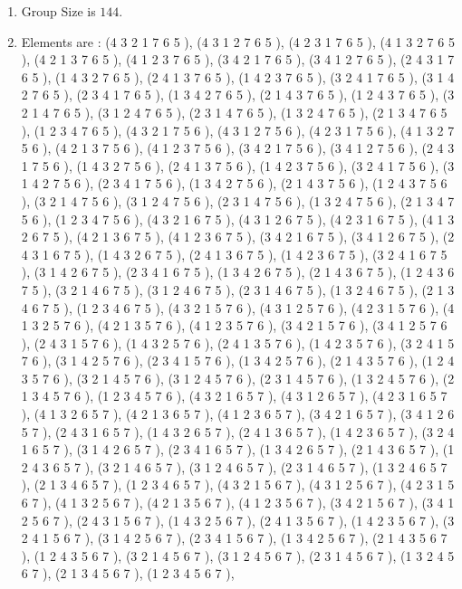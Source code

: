 \documentclass[12pt]{article}
\begin{document}
\begin{enumerate}
\item Group Size is $144$.
\item Elements are : (4 3 2 1 7 6 5  ), (4 3 1 2 7 6 5  ), (4 2 3 1 7 6 5  ), (4 1 3 2 7 6 5  ), (4 2 1 3 7 6 5  ), (4 1 2 3 7 6 5  ), (3 4 2 1 7 6 5  ), (3 4 1 2 7 6 5  ), (2 4 3 1 7 6 5  ), (1 4 3 2 7 6 5  ), (2 4 1 3 7 6 5  ), (1 4 2 3 7 6 5  ), (3 2 4 1 7 6 5  ), (3 1 4 2 7 6 5  ), (2 3 4 1 7 6 5  ), (1 3 4 2 7 6 5  ), (2 1 4 3 7 6 5  ), (1 2 4 3 7 6 5  ), (3 2 1 4 7 6 5  ), (3 1 2 4 7 6 5  ), (2 3 1 4 7 6 5  ), (1 3 2 4 7 6 5  ), (2 1 3 4 7 6 5  ), (1 2 3 4 7 6 5  ), (4 3 2 1 7 5 6  ), (4 3 1 2 7 5 6  ), (4 2 3 1 7 5 6  ), (4 1 3 2 7 5 6  ), (4 2 1 3 7 5 6  ), (4 1 2 3 7 5 6  ), (3 4 2 1 7 5 6  ), (3 4 1 2 7 5 6  ), (2 4 3 1 7 5 6  ), (1 4 3 2 7 5 6  ), (2 4 1 3 7 5 6  ), (1 4 2 3 7 5 6  ), (3 2 4 1 7 5 6  ), (3 1 4 2 7 5 6  ), (2 3 4 1 7 5 6  ), (1 3 4 2 7 5 6  ), (2 1 4 3 7 5 6  ), (1 2 4 3 7 5 6  ), (3 2 1 4 7 5 6  ), (3 1 2 4 7 5 6  ), (2 3 1 4 7 5 6  ), (1 3 2 4 7 5 6  ), (2 1 3 4 7 5 6  ), (1 2 3 4 7 5 6  ), (4 3 2 1 6 7 5  ), (4 3 1 2 6 7 5  ), (4 2 3 1 6 7 5  ), (4 1 3 2 6 7 5  ), (4 2 1 3 6 7 5  ), (4 1 2 3 6 7 5  ), (3 4 2 1 6 7 5  ), (3 4 1 2 6 7 5  ), (2 4 3 1 6 7 5  ), (1 4 3 2 6 7 5  ), (2 4 1 3 6 7 5  ), (1 4 2 3 6 7 5  ), (3 2 4 1 6 7 5  ), (3 1 4 2 6 7 5  ), (2 3 4 1 6 7 5  ), (1 3 4 2 6 7 5  ), (2 1 4 3 6 7 5  ), (1 2 4 3 6 7 5  ), (3 2 1 4 6 7 5  ), (3 1 2 4 6 7 5  ), (2 3 1 4 6 7 5  ), (1 3 2 4 6 7 5  ), (2 1 3 4 6 7 5  ), (1 2 3 4 6 7 5  ), (4 3 2 1 5 7 6  ), (4 3 1 2 5 7 6  ), (4 2 3 1 5 7 6  ), (4 1 3 2 5 7 6  ), (4 2 1 3 5 7 6  ), (4 1 2 3 5 7 6  ), (3 4 2 1 5 7 6  ), (3 4 1 2 5 7 6  ), (2 4 3 1 5 7 6  ), (1 4 3 2 5 7 6  ), (2 4 1 3 5 7 6  ), (1 4 2 3 5 7 6  ), (3 2 4 1 5 7 6  ), (3 1 4 2 5 7 6  ), (2 3 4 1 5 7 6  ), (1 3 4 2 5 7 6  ), (2 1 4 3 5 7 6  ), (1 2 4 3 5 7 6  ), (3 2 1 4 5 7 6  ), (3 1 2 4 5 7 6  ), (2 3 1 4 5 7 6  ), (1 3 2 4 5 7 6  ), (2 1 3 4 5 7 6  ), (1 2 3 4 5 7 6  ), (4 3 2 1 6 5 7  ), (4 3 1 2 6 5 7  ), (4 2 3 1 6 5 7  ), (4 1 3 2 6 5 7  ), (4 2 1 3 6 5 7  ), (4 1 2 3 6 5 7  ), (3 4 2 1 6 5 7  ), (3 4 1 2 6 5 7  ), (2 4 3 1 6 5 7  ), (1 4 3 2 6 5 7  ), (2 4 1 3 6 5 7  ), (1 4 2 3 6 5 7  ), (3 2 4 1 6 5 7  ), (3 1 4 2 6 5 7  ), (2 3 4 1 6 5 7  ), (1 3 4 2 6 5 7  ), (2 1 4 3 6 5 7  ), (1 2 4 3 6 5 7  ), (3 2 1 4 6 5 7  ), (3 1 2 4 6 5 7  ), (2 3 1 4 6 5 7  ), (1 3 2 4 6 5 7  ), (2 1 3 4 6 5 7  ), (1 2 3 4 6 5 7  ), (4 3 2 1 5 6 7  ), (4 3 1 2 5 6 7  ), (4 2 3 1 5 6 7  ), (4 1 3 2 5 6 7  ), (4 2 1 3 5 6 7  ), (4 1 2 3 5 6 7  ), (3 4 2 1 5 6 7  ), (3 4 1 2 5 6 7  ), (2 4 3 1 5 6 7  ), (1 4 3 2 5 6 7  ), (2 4 1 3 5 6 7  ), (1 4 2 3 5 6 7  ), (3 2 4 1 5 6 7  ), (3 1 4 2 5 6 7  ), (2 3 4 1 5 6 7  ), (1 3 4 2 5 6 7  ), (2 1 4 3 5 6 7  ), (1 2 4 3 5 6 7  ), (3 2 1 4 5 6 7  ), (3 1 2 4 5 6 7  ), (2 3 1 4 5 6 7  ), (1 3 2 4 5 6 7  ), (2 1 3 4 5 6 7  ), (1 2 3 4 5 6 7  ), 
\end{enumerate}
\end{document}
